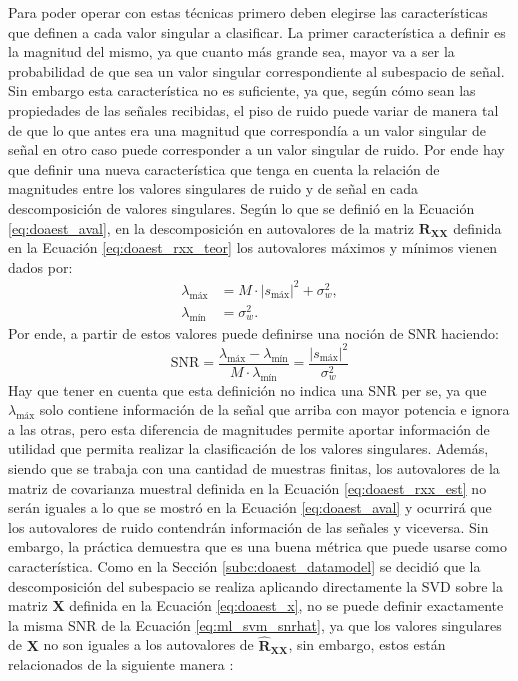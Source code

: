 Para poder operar con estas técnicas primero deben elegirse las características que definen a cada valor singular a clasificar. La primer característica a definir es la magnitud del mismo, ya que cuanto más grande sea, mayor va a ser la probabilidad de que sea un valor singular correspondiente al subespacio de señal. Sin embargo esta característica no es suficiente, ya que, según cómo sean las propiedades de las señales recibidas, el piso de ruido puede variar de manera tal de que lo que antes era una magnitud que correspondía a un valor singular de señal en otro caso puede corresponder a un valor singular de ruido. Por ende hay que definir una nueva característica que tenga en cuenta la relación de magnitudes entre los valores singulares de ruido y de señal en cada descomposición de valores singulares. Según lo que se definió en la Ecuación \ref{eq:doaest_aval}, en la descomposición en autovalores de la matriz $\mathbf{R_{XX}}$ definida en la Ecuación \ref{eq:doaest_rxx_teor} los autovalores máximos y mínimos vienen dados por:
\begin{align}
  \lambda_{\textrm{máx}} & = M \cdot |s_{\textrm{máx}}|^2+\sigma_w^2, \\
  \lambda_{\textrm{mín}} & = \sigma_w^2.
\end{align}
Por ende, a partir de estos valores puede definirse una noción de SNR haciendo:
\begin{equation}
  \hat{\mathrm{SNR}} = \frac{\lambda_{\textrm{máx}}-\lambda_{\textrm{mín}}}{M\cdot \lambda_{\textrm{mín}}}=\frac{|s_{\textrm{máx}}|^2}{\sigma_w^2}
  \label{eq:ml_svm_snrhat}
\end{equation}
Hay que tener en cuenta que esta definición no indica una SNR per se, ya que $\lambda_{\textrm{máx}}$ solo contiene información de la señal que arriba con mayor potencia e ignora a las otras, pero esta diferencia de magnitudes permite aportar información de utilidad que permita realizar la clasificación de los valores singulares. Además, siendo que se trabaja con una cantidad de muestras finitas, los autovalores de la matriz de covarianza muestral definida en la Ecuación \ref{eq:doaest_rxx_est} no serán iguales a lo que se mostró en la Ecuación \ref{eq:doaest_aval} y ocurrirá que los autovalores de ruido contendrán información de las señales y viceversa. Sin embargo, la práctica demuestra que es una buena métrica que puede usarse como característica. Como en la Sección \ref{subc:doaest_datamodel} se decidió que la descomposición del subespacio se realiza aplicando directamente la SVD sobre la matriz $\mathbf{X}$ definida en la Ecuación \ref{eq:doaest_x}, no se puede definir exactamente la misma SNR de la Ecuación \ref{eq:ml_svm_snrhat}, ya que los valores singulares de $\mathbf{X}$ no son iguales a los autovalores de $\mathbf{\hat{R}_{XX}}$, sin embargo, estos están relacionados de la siguiente manera \cite{bib:strang}:
